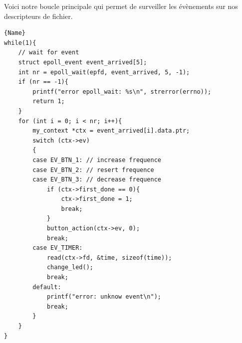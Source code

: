 \documentclass[
	a4paper, %
	10pt, %
]{CSUniSchoolLabReport}
\begin{document}
Voici notre boucle principale qui permet de surveiller les évènements sur nos descripteurs de fichier.

\begin{lstlisting}[style=CStyle, caption=Boucle principale, firstnumber=1]{Name}
while(1){
	// wait for event
	struct epoll_event event_arrived[5];
	int nr = epoll_wait(epfd, event_arrived, 5, -1);
	if (nr == -1){
		printf("error epoll_wait: %s\n", strerror(errno));
		return 1;
	}
	for (int i = 0; i < nr; i++){
		my_context *ctx = event_arrived[i].data.ptr;
		switch (ctx->ev)
		{
		case EV_BTN_1: // increase frequence
		case EV_BTN_2: // resert frequence
		case EV_BTN_3: // decrease frequence
			if (ctx->first_done == 0){
				ctx->first_done = 1;
				break;
			}
			button_action(ctx->ev, 0);
			break;
		case EV_TIMER:
			read(ctx->fd, &time, sizeof(time));
			change_led();
			break;
		default:
			printf("error: unknow event\n");
			break;
		}
	}
}
\end{lstlisting}
\end{document}
